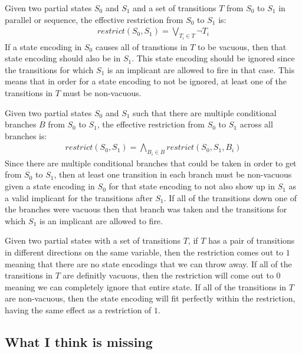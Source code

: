 \begin{lemma}
Given two partial states $S_0$ and $S_1$ and a set of transitions $T$ from $S_0$ to $S_1$ in parallel or sequence, the effective restriction from $S_0$ to $S_1$ is:
\begin{align}
restrict(S_0, S_1) = \bigvee_{T_i \in T} \neg T_i
\end{align}
If a state encoding in $S_0$ causes all of transtions in $T$ to be vacuous, then that state encoding should also be in $S_1$. This state encoding should be ignored since the transitions for which $S_1$ is an implicant are allowed to fire in that case. This means that in order for a state encoding to not be ignored, at least one of the transitions in $T$ must be non-vacuous.
\end{lemma}

\begin{lemma}
Given two partial states $S_0$ and $S_1$ such that there are multiple conditional branches $B$ from $S_0$ to $S_1$, the effective restriction from $S_0$ to $S_1$ across all branches is:
\begin{align}
restrict(S_0, S_1) = \bigwedge_{B_i \in B} restrict(S_0, S_1, B_i)
\end{align}
Since there are multiple conditional branches that could be taken in order to get from $S_0$ to $S_1$, then at least one transition in each branch must be non-vacuous given a state encoding in $S_0$ for that state encoding to not also show up in $S_1$ as a valid implicant for the transitions after $S_1$. If all of the transitions down one of the branches were vacuous then that branch was taken and the transitions for which $S_1$ is an implicant are allowed to fire.
\end{lemma}

Given two partial states with a set of transitions $T$, if $T$ has a pair of transitions in different directions on the same variable, then the restriction comes out to $1$ meaning that there are no state encodings that we can throw away. If all of the transitions in $T$ are definitly vacuous, then the restriction will come out to $0$ meaning we can completely ignore that entire state. If all of the transitions in $T$ are non-vacuous, then the state encoding will fit perfectly within the restriction, having the same effect as a restriction of $1$.

\subsection{What I think is missing}

